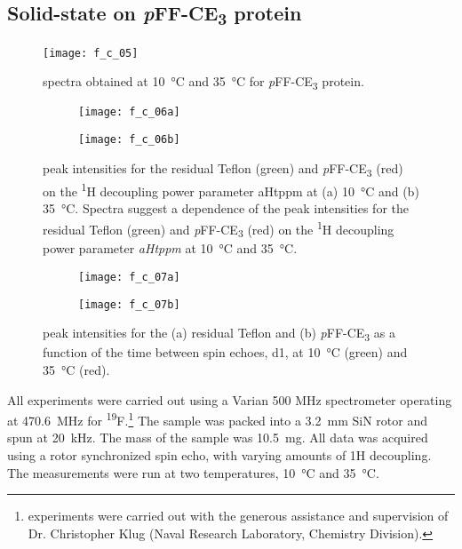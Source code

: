 \begin{refsection}
\section{Solid-state  on \emph{p}FF-CE\textsubscript{3} protein}
\label{sec:ss_nmr}
\begin{figure}[h!] \centering \texttt{[image: f\_c\_05]}
    \caption{ spectra obtained at \SI{10}{\celsius} and
    \SI{35}{\celsius} for \emph{p}FF-CE\textsubscript{3} protein.}
    \label{fig:nmr_result_1} \end{figure}
\begin{figure}
    \centering
    \begin{subfigure}[b]{0.4\textwidth}
        \texttt{[image: f\_c\_06a]}
    \end{subfigure}
    \begin{subfigure}[b]{0.4\textwidth}
        \texttt{[image: f\_c\_06b]}
    \end{subfigure}
    \caption{ peak intensities for the residual Teflon (green) and
    \emph{p}FF-CE\textsubscript{3} (red) on the \textsuperscript{1}H decoupling
    power parameter aHtppm at (a) \SI{10}{\celsius} and (b)
    \SI{35}{\celsius}.  Spectra suggest a dependence of the peak intensities for
    the residual Teflon (green) and \emph{p}FF-CE\textsubscript{3} (red) on the
    \textsuperscript{1}H decoupling power parameter \emph{aHtppm} at
    \SI{10}{\celsius} and \SI{35}{\celsius}.}\label{fig:nmr_result_2}
\end{figure}
\begin{figure}
    \centering
    \begin{subfigure}[b]{0.4\textwidth}
        \texttt{[image: f\_c\_07a]}
    \end{subfigure}
    \begin{subfigure}[b]{0.4\textwidth}
        \texttt{[image: f\_c\_07b]}
    \end{subfigure}
    \caption{ peak intensities for the (a) residual Teflon and (b)
    \emph{p}FF-CE\textsubscript{3} as a function of the time between spin
    echoes, d1, at \SI{10}{\celsius} (green) and \SI{35}{\celsius} (red).}
    \label{fig:nmr_result_3}
\end{figure}
All experiments were carried out using a Varian 500 MHz spectrometer operating
at \SI{470.6}{\mega\hertz} for \textsuperscript{19}F.\footnote{
experiments were carried out with the generous assistance and supervision of Dr.
Christopher Klug (Naval Research Laboratory, Chemistry Division).}
The sample was packed into a \SI{3.2}{\mm} SiN rotor and spun at
\SI{20}{\kilo\hertz}.  The mass of the sample was \SI{10.5}{\mg}.  All data was
acquired using a rotor synchronized spin echo, with varying amounts of 1H
decoupling. The measurements were run at two temperatures, \SI{10}{\celsius} and
\SI{35}{\celsius}.


\end{refsection}
